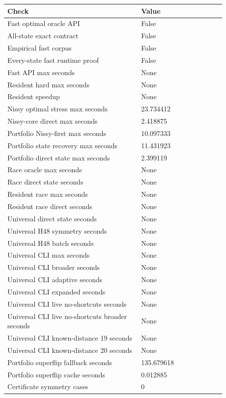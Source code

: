 {\small
\begin{tabular}{@{}p{0.54\linewidth}p{0.34\linewidth}@{}}
\hline
Check & Value \\
\hline
Fast optimal oracle API & False \\
All-state exact contract & False \\
Empirical fast corpus & False \\
Every-state fast runtime proof & False \\
Fast API max seconds & None \\
Resident hard max seconds & None \\
Resident speedup & None \\
Nissy optimal stress max seconds & 23.734412 \\
Nissy-core direct max seconds & 2.418875 \\
Portfolio Nissy-first max seconds & 10.097333 \\
Portfolio state recovery max seconds & 11.431923 \\
Portfolio direct state max seconds & 2.399119 \\
Race oracle max seconds & None \\
Race direct state seconds & None \\
Resident race max seconds & None \\
Resident race direct seconds & None \\
Universal direct state seconds & None \\
Universal H48 symmetry seconds & None \\
Universal H48 batch seconds & None \\
Universal CLI max seconds & None \\
Universal CLI broader seconds & None \\
Universal CLI adaptive seconds & None \\
Universal CLI expanded seconds & None \\
Universal CLI live no-shortcuts seconds & None \\
Universal CLI live no-shortcuts broader seconds & None \\
Universal CLI known-distance 19 seconds & None \\
Universal CLI known-distance 20 seconds & None \\
Portfolio superflip fallback seconds & 135.679618 \\
Portfolio superflip cache seconds & 0.012885 \\
Certificate symmetry cases & 0 \\

\end{tabular}}
